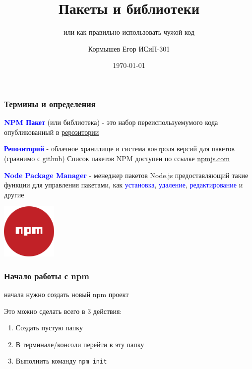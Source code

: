 \documentclass[aspectratio=169]{beamer}
\title{Пакеты и библиотеки}
\subtitle{или как правильно использовать чужой код}
\author{Кормышев Егор ИСиП-301}
\date{\today}
\begin{document}
\frame{\titlepage}


\begin{frame}
\frametitle{Термины и определения}


\textcolor{blue}{\textbf{NPM Пакет}} (или библиотека) -  это набор переиспользуемумого кода опубликованный в \underline{рерозитории}

\bigskip


\textcolor{blue}{\textbf{Репозиторий}} - облачное хранилище и система контроля версий для пакетов (сравнимо с github) 
Список пакетов NPM доступен по ссылке \underline{\href{https://www.npmjs.com/}{npmjs.com}}

\bigskip


\textcolor{blue}{\textbf{Node Package Manager}} - менеджер пакетов Node.js предоставляющий такие функции для управления пакетами, как \textcolor{blue}{установка}, \textcolor{blue}{удаление}, \textcolor{blue}{редактирование} и другие

\bigskip
\begin{center}
\includegraphics[width=0.2\textwidth]{assets/npmicon.png}
\end{center}

\end{frame}


\begin{frame}
  \frametitle{Начало работы с npm}
  \begin{center}
     начала нужно создать новый npm проект 
  \end{center}
  
  \bigskip
  
  Это можно сделать всего в 3 действия:
  \begin{enumerate}
  \item Создать пустую папку
  \item В терминале/консоли перейти в эту папку
  \item Выполнить команду \texttt{npm init}
  \end{enumerate}
\end{frame}
\end{document}
